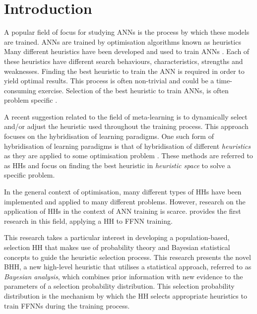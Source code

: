 \section{Introduction}
\label{sec:introduction}

A popular field of focus for studying \acp{ANN} is the process by which these models are trained. \acp{ANN} are trained by optimisation algorithms known as heuristics Many different heuristics have been developed and used to train \acp{ANN}  \cite{ref:gudise:2003, ref:rakitianskaia:2012, ref:montana:1989}. Each of these heuristics have different search behaviours, characteristics, strengths and weaknesses. Finding the best heuristic to train the \acs{ANN} is required in order to yield optimal results. This process is often non-trivial and could be a time-consuming exercise. Selection of the best heuristic to train \acp{ANN}, is often problem specific \cite{ref:allen:1996, ref:drake:2020, ref:pillay:2018}.

A recent suggestion related to the field of meta-learning is to dynamically select and/or adjust the heuristic used throughout the training process. This approach focuses on the hybridisation of learning paradigms. One such form of hybridisation of learning paradigms is that of hybridisation of different \textit{heuristics} as they are applied to some optimisation problem  \cite{ref:burke:2013}. These methods are referred to as \acfp{HH} and focus on finding the best heuristic in \textit{heuristic space} to solve a specific problem.

In the general context of optimisation, many different types of \acp{HH} have been implemented and applied to many different problems. However, research on the application of \acp{HH} in the context of \acs{ANN} training is scarce. \citeauthor{ref:nel:2021}  \cite{ref:nel:2021} provides the first research in this field, applying a \acs{HH} to \acs{FFNN} training.

This research takes a particular interest in developing a population-based, selection \acs{HH} that makes use of probability theory and Bayesian statistical concepts to guide the heuristic selection process. This research presents the novel \Acf{BHH}, a new high-level heuristic that utilises a statistical approach, referred to as \textit{Bayesian analysis}, which combines prior information with new evidence to the parameters of a selection probability distribution. This selection probability distribution is the mechanism by which the \acs{HH} selects appropriate heuristics to train \acp{FFNN} during the training process.

